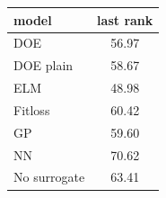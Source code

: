 \begin{tabular}{|lc|}
\hline
model & last rank\\
\hline
DOE & 56.97 \\
DOE plain & 58.67 \\
ELM & 48.98 \\
Fitloss & 60.42 \\
GP & 59.60 \\
NN & 70.62 \\
No surrogate & 63.41 \\
\hline
\end{tabular}
